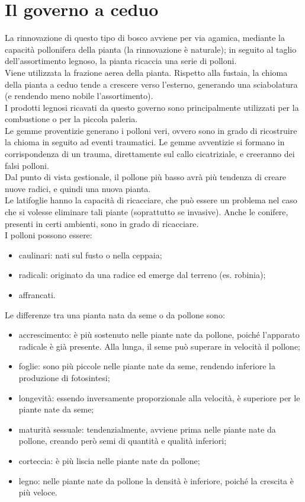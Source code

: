 \documentclass{article}
\begin{document}
\section{Il governo a ceduo}
La rinnovazione di questo tipo di bosco avviene per via agamica, mediante la capacità pollonifera della pianta (la rinnovazione è naturale); in seguito al taglio dell'assortimento legnoso, la pianta ricaccia una serie di polloni.\\
Viene utilizzata la frazione aerea della pianta. Rispetto alla fustaia, la chioma della pianta a ceduo tende a crescere verso l'esterno, generando una sciabolatura (e rendendo meno nobile l'assortimento).\\
I prodotti legnosi ricavati da questo governo sono principalmente utilizzati per la combustione o per la piccola paleria.\\
Le gemme proventizie generano i polloni veri, ovvero sono in grado di ricostruire la chioma in seguito ad eventi traumatici. Le gemme avventizie si formano in corrispondenza di un trauma, direttamente sul callo cicatriziale, e creeranno dei falsi polloni.\\
Dal punto di vista gestionale, il pollone più basso avrà più tendenza di creare nuove radici, e quindi una nuova pianta.\\
Le latifoglie hanno la capacità di ricacciare, che può essere un problema nel caso che si volesse eliminare tali piante (soprattutto se invasive). Anche le conifere, presenti in certi ambienti, sono in grado di ricacciare.\\
I polloni possono essere:
\begin{itemize}
    \item caulinari: nati sul fusto o nella ceppaia;
    \item radicali: originato da una radice ed emerge dal terreno (es. robinia);
    \item affrancati.
\end{itemize}
Le differenze tra una pianta nata da seme o da pollone sono:
\begin{itemize}
    \item accrescimento: è più sostenuto nelle piante nate da pollone, poiché l'apparato radicale è già presente. Alla lunga, il seme può superare in velocità il pollone;
    \item foglie: sono più piccole nelle piante nate da seme, rendendo inferiore la produzione di fotosintesi;
    \item longevità: essendo inversamente proporzionale alla velocità, è superiore per le piante nate da seme;
    \item maturità sessuale: tendenzialmente, avviene prima nelle piante nate da pollone, creando però semi di quantità e qualità inferiori;
    \item corteccia: è più liscia nelle piante nate da pollone;
    \item legno: nelle piante nate da pollone la densità è inferiore, poiché la crescita è più veloce.
\end{itemize}
\end{document}
